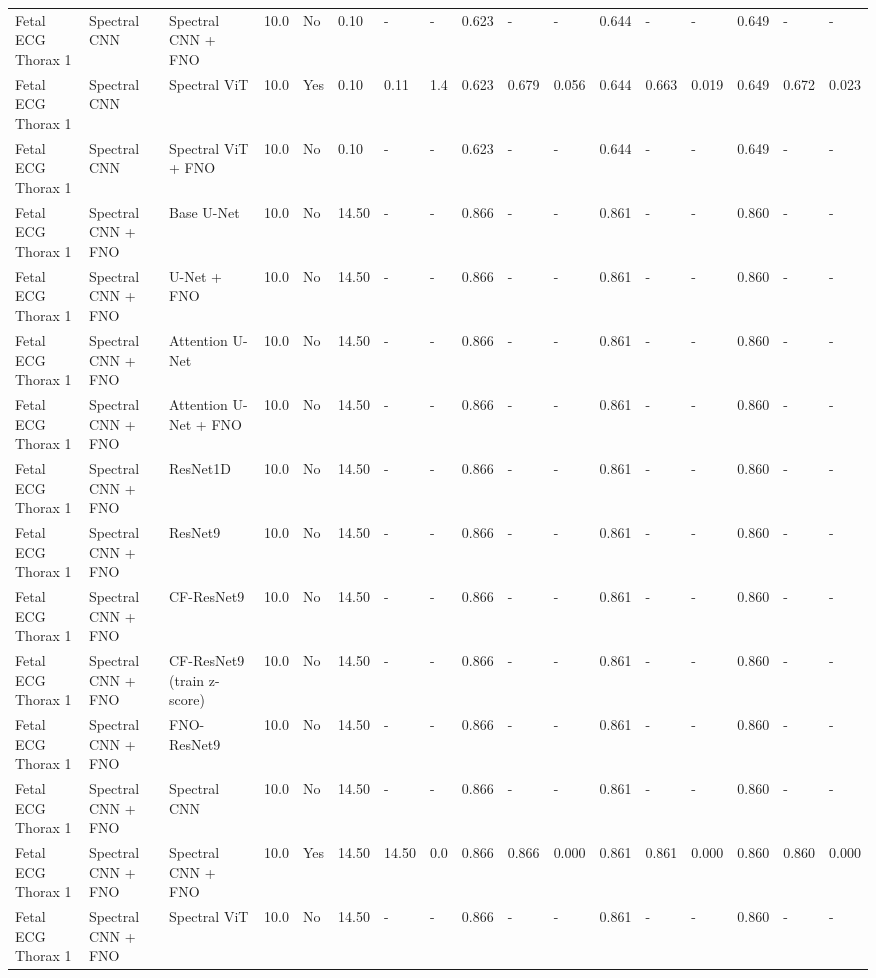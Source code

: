 \begin{longtable}{lllllllllllllllll}
Fetal ECG Thorax 1 & Spectral CNN & Spectral CNN + FNO & 10.0 & No & 0.10 & - & - & 0.623 & - & - & 0.644 & - & - & 0.649 & - & - \\
Fetal ECG Thorax 1 & Spectral CNN & Spectral ViT & 10.0 & Yes & 0.10 & 0.11 & 1.4 & 0.623 & 0.679 & 0.056 & 0.644 & 0.663 & 0.019 & 0.649 & 0.672 & 0.023 \\
Fetal ECG Thorax 1 & Spectral CNN & Spectral ViT + FNO & 10.0 & No & 0.10 & - & - & 0.623 & - & - & 0.644 & - & - & 0.649 & - & - \\
Fetal ECG Thorax 1 & Spectral CNN + FNO & Base U-Net & 10.0 & No & 14.50 & - & - & 0.866 & - & - & 0.861 & - & - & 0.860 & - & - \\
Fetal ECG Thorax 1 & Spectral CNN + FNO & U-Net + FNO & 10.0 & No & 14.50 & - & - & 0.866 & - & - & 0.861 & - & - & 0.860 & - & - \\
Fetal ECG Thorax 1 & Spectral CNN + FNO & Attention U-Net & 10.0 & No & 14.50 & - & - & 0.866 & - & - & 0.861 & - & - & 0.860 & - & - \\
Fetal ECG Thorax 1 & Spectral CNN + FNO & Attention U-Net + FNO & 10.0 & No & 14.50 & - & - & 0.866 & - & - & 0.861 & - & - & 0.860 & - & - \\
Fetal ECG Thorax 1 & Spectral CNN + FNO & ResNet1D & 10.0 & No & 14.50 & - & - & 0.866 & - & - & 0.861 & - & - & 0.860 & - & - \\
Fetal ECG Thorax 1 & Spectral CNN + FNO & ResNet9 & 10.0 & No & 14.50 & - & - & 0.866 & - & - & 0.861 & - & - & 0.860 & - & - \\
Fetal ECG Thorax 1 & Spectral CNN + FNO & CF-ResNet9 & 10.0 & No & 14.50 & - & - & 0.866 & - & - & 0.861 & - & - & 0.860 & - & - \\
Fetal ECG Thorax 1 & Spectral CNN + FNO & CF-ResNet9 (train z-score) & 10.0 & No & 14.50 & - & - & 0.866 & - & - & 0.861 & - & - & 0.860 & - & - \\
Fetal ECG Thorax 1 & Spectral CNN + FNO & FNO-ResNet9 & 10.0 & No & 14.50 & - & - & 0.866 & - & - & 0.861 & - & - & 0.860 & - & - \\
Fetal ECG Thorax 1 & Spectral CNN + FNO & Spectral CNN & 10.0 & No & 14.50 & - & - & 0.866 & - & - & 0.861 & - & - & 0.860 & - & - \\
Fetal ECG Thorax 1 & Spectral CNN + FNO & Spectral CNN + FNO & 10.0 & Yes & 14.50 & 14.50 & 0.0 & 0.866 & 0.866 & 0.000 & 0.861 & 0.861 & 0.000 & 0.860 & 0.860 & 0.000 \\
Fetal ECG Thorax 1 & Spectral CNN + FNO & Spectral ViT & 10.0 & No & 14.50 & - & - & 0.866 & - & - & 0.861 & - & - & 0.860 & - & - \\

\end{longtable}
